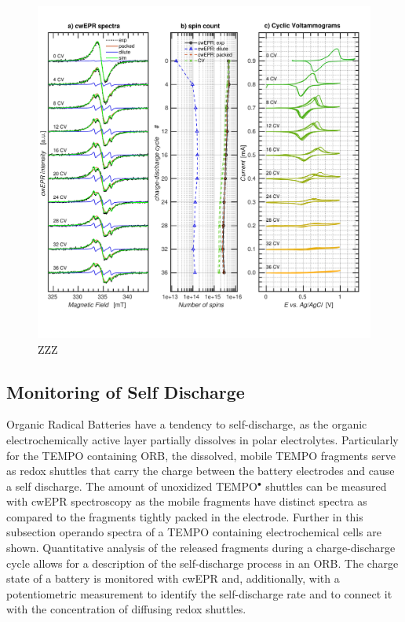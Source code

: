 \begin{figure}[!h]
\center
	\includegraphics[width=1\textwidth]{./operando_epr/figures/degradation/repeated_cycling_degradation_dits.pdf}
	\caption{ZZZ}
	\label{fig:repeated_cycling_degradation}
\end{figure}





\subsection{Monitoring of Self Discharge}
Organic Radical Batteries have a tendency to self-discharge, as the organic electrochemically active layer partially dissolves in polar electrolytes. Particularly for the TEMPO containing ORB, the dissolved, mobile TEMPO fragments serve as redox shuttles that carry the charge between the battery electrodes and cause a self discharge. The amount of unoxidized TEMPO$^\bullet$ shuttles can be measured with cwEPR spectroscopy as the mobile fragments have distinct spectra as compared to the fragments tightly packed in the electrode. Further in this subsection operando spectra of a TEMPO containing electrochemical cells are shown. Quantitative analysis of the released fragments during a charge-discharge cycle allows for a description of the self-discharge process in an ORB. The charge state of a battery is monitored with cwEPR and, additionally, with a potentiometric measurement to identify the self-discharge rate and to connect it with the concentration of diffusing redox shuttles.

